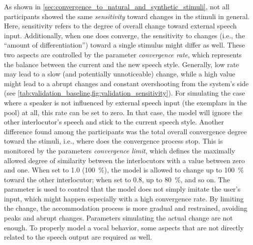 As shown in \cref{sec:convergence_to_natural_and_synthetic_stimuli}, not all participants showed the same \textit{sensitivity} toward changes in the stimuli in general.
Here, sensitivity refers to the degree of overall change toward external speech input.
Additionally, when one does converge, the sensitivity to changes (i.e., the \enquote{amount of differentiation}) toward a single stimulus might differ as well.
These two aspects are controlled by the parameter \textit{convergence rate}, which represents the balance between the current and the new speech style.
Generally, low rate may lead to a slow (and potentially unnoticeable) change, while a high value might lead to a abrupt changes and constant overshooting from the system's side (see \cref{tab:validation_baseline,fig:validation_sensitivity}).
For simulating the case where a speaker is not influenced by external speech input (the exemplars in the pool) at all, this rate can be set to zero.
In that case, the model will ignore the other interlocutor's speech and stick to the current speech style.
Another difference found among the participants was the total overall convergence degree toward the stimuli, i.e., where does the convergence process stop.
This is monitored by the parameters \textit{convergence limit}, which defines the maximally allowed degree of similarity between the interlocutors with a value between zero and one.
When set to 1.0 (\SI{100}{\percent}), the model is allowed to change up to \SI{100}{\percent} toward the other interlocutor; when set to 0.8, up to \SI{80}{\percent}, and so on.
The parameter is used to control that the model does not simply imitate the user's input, which might happen especially with a high convergence rate.
By limiting the change, the accommodation process is more gradual and restrained, avoiding peaks and abrupt changes.
Parameters simulating the actual change are not enough.
To properly model a vocal behavior, some aspects that are not directly related to the speech output are required as well.

